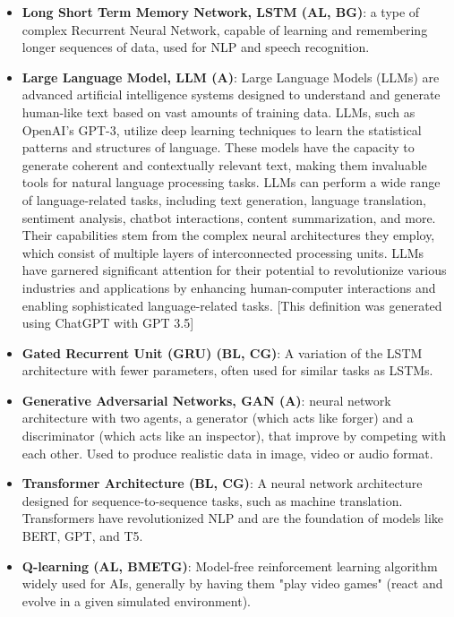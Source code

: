 \documentclass{article}
\begin{document}
\begin{itemize}
	\item \textbf{Long Short Term Memory Network, LSTM (AL, BG)}: a type of complex Recurrent Neural Network, capable of learning and remembering longer sequences of data, used for NLP and speech recognition.

	\item \textbf{Large Language Model, LLM (A)}: Large Language Models (LLMs) are advanced artificial intelligence systems designed to understand and generate human-like text based on vast amounts of training data. LLMs, such as OpenAI's GPT-3, utilize deep learning techniques to learn the statistical patterns and structures of language. These models have the capacity to generate coherent and contextually relevant text, making them invaluable tools for natural language processing tasks. LLMs can perform a wide range of language-related tasks, including text generation, language translation, sentiment analysis, chatbot interactions, content summarization, and more. Their capabilities stem from the complex neural architectures they employ, which consist of multiple layers of interconnected processing units. LLMs have garnered significant attention for their potential to revolutionize various industries and applications by enhancing human-computer interactions and enabling sophisticated language-related tasks. [This definition was generated using ChatGPT with GPT 3.5]

	\item \textbf{Gated Recurrent Unit (GRU) (BL, CG)}: A variation of the LSTM architecture with fewer parameters, often used for similar tasks as LSTMs.

	\item \textbf{Generative Adversarial Networks, GAN (A)}: neural network architecture with two agents, a generator (which acts like forger) and a discriminator (which acts like an inspector), that improve by competing with each other. Used to produce realistic data in image, video or audio format.

	\item \textbf{Transformer Architecture (BL, CG)}: A neural network architecture designed for sequence-to-sequence tasks, such as machine translation. Transformers have revolutionized NLP and are the foundation of models like BERT, GPT, and T5.

	\item \textbf{Q-learning (AL, BMETG)}: Model-free reinforcement learning algorithm widely used for AIs, generally by having them "play video games" (react and evolve in a given simulated environment).

\end{itemize}
\end{document}
